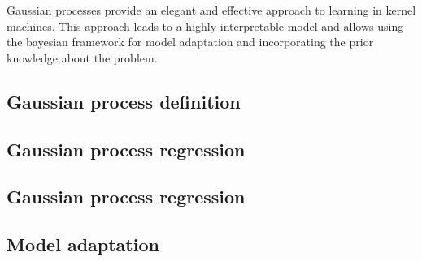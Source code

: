 Gaussian processes provide an elegant and effective approach to learning in kernel machines. This approach leads to a highly interpretable model and allows using the bayesian framework for model adaptation and incorporating the prior knowledge about the problem.

\subsection{Gaussian process definition}
	
\subsection{Gaussian process regression}
	
\subsection{Gaussian process regression}
	
\subsection{Model adaptation}
	